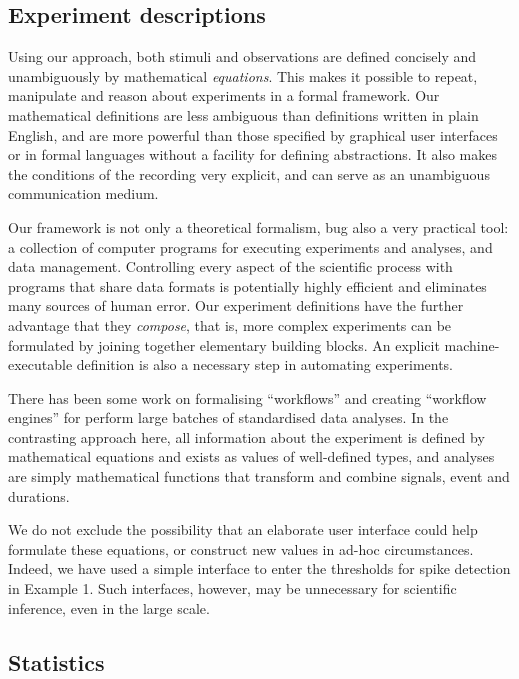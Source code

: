 \subsection*{Experiment descriptions}

Using our approach, both stimuli and observations are defined
concisely and unambiguously by mathematical \emph{equations}. This
makes it possible to repeat, manipulate and reason about experiments
in a formal framework. Our mathematical definitions are less ambiguous
than definitions written in plain English, and are more powerful than
those specified by graphical user interfaces or in formal languages
without a facility for defining abstractions. It also makes the
conditions of the recording very explicit, and can serve as an
unambiguous communication medium.

Our framework is not only a theoretical formalism, bug also a very
practical tool: a collection of computer programs for executing
experiments and analyses, and data management. Controlling every
aspect of the scientific process with programs that share data formats
is potentially highly efficient and eliminates many sources of human
error. Our experiment definitions have the further advantage that they
\emph{compose}, that is, more complex experiments can be formulated by
joining together elementary building blocks. An explicit
machine-executable definition is also a necessary step in automating
experiments.

There has been some work on formalising ``workflows'' and creating
``workflow engines'' for perform large batches of standardised data
analyses. In the contrasting approach here, all information about the
experiment is defined by mathematical equations and exists as values
of well-defined types, and analyses are simply mathematical functions
that transform and combine signals, event and durations.

We do not exclude the possibility that an elaborate user interface
could help formulate these equations, or construct new values in
ad-hoc circumstances. Indeed, we have used a simple interface to enter
the thresholds for spike detection in Example 1. Such interfaces,
however, may be unnecessary for scientific inference, even in the
large scale.

\subsection*{Statistics}

